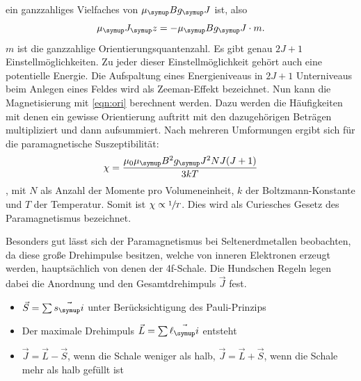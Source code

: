 ein ganzzahliges Vielfaches von $\mu_\su{B}g_\su{J}$ ist, also
\begin{equation}
  \mu_\su{J_\su{z}} = -\mu_\su{B}g_\su{J}\cdot m. \label{eqn:ori}
\end{equation}
$m$ ist die ganzzahlige Orientierungsquantenzahl. Es gibt genau $2J+1$
Einstellmöglichkeiten. Zu jeder dieser Einstellmöglichkeit gehört auch eine
potentielle Energie. Die Aufspaltung eines Energieniveaus in $2J+1$ Unterniveaus
beim Anlegen eines Feldes wird als Zeeman-Effekt bezeichnet.
Nun kann die Magnetisierung mit \eqref{eqn:ori} berechnent werden. Dazu werden
die Häufigkeiten mit denen ein gewisse Orientierung auftritt mit den dazugehörigen
Beträgen multipliziert und dann aufsummiert. Nach mehreren Umformungen ergibt
sich für die paramagnetische Suszeptibilität:
\begin{equation}
  \chi = \frac{\mu_0 \mu_\su{B}^2 g_\su{J}^2 N J(J+1)}{3kT}
\end{equation}
, mit $N$ als Anzahl der Momente pro Volumeneinheit, $k$ der Boltzmann-Konstante
 und $T$ der Temperatur. Somit ist $\chi \propto \sfrac{1}{T}$. Dies wird als Curiesches
 Gesetz des Paramagnetismus bezeichnet.

 Besonders gut lässt sich der Paramagnetismus bei Seltenerdmetallen beobachten,
 da diese große Drehimpulse besitzen, welche von inneren Elektronen erzeugt werden,
 hauptsächlich von denen der 4f-Schale. Die Hundschen Regeln legen dabei die
 Anordnung und den Gesamtdrehimpuls $\vec{J}$ fest.
 \begin{itemize}
   \item $\vec{S} = \sum \vec{s_\su{i}}$ unter Berücksichtigung des
   Pauli-Prinzips \\
   \item Der maximale Drehimpuls $\vec{L} = \sum \vec{\ell_\su{i}}$ entsteht \\
   \item $\vec{J} = \vec{L}-\vec{S}$, wenn die Schale weniger als halb,
   $\vec{J}= \vec{L}+\vec{S}$, wenn die Schale mehr als halb gefüllt ist \\
 \end{itemize}
